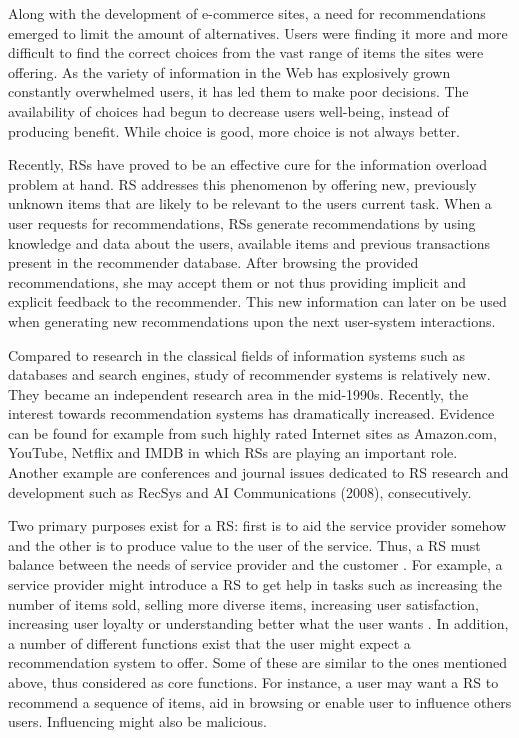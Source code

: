 \documentclass[12pt,a4paper,english
]{tutthesis}
\begin{document}
Along with the development of e-commerce sites, a need for recommendations emerged to limit the amount of alternatives. Users were finding it more and more difficult to find the correct choices from the vast range of items the sites were offering. As the variety of information in the Web has explosively grown constantly overwhelmed users, it has led them to make poor decisions. The availability of choices had begun to decrease users well-being, instead of producing benefit. While choice is good, more choice is not always better. \cite{ricci11}

Recently, RSs have proved to be an effective cure for the information overload problem at hand. RS addresses this phenomenon by offering new, previously unknown items that are likely to be relevant to the users current task. When a user requests for recommendations, RSs generate recommendations by using knowledge and data about the users, available items and previous transactions present in the recommender database. After browsing the provided recommendations, she may accept them or not thus providing implicit and explicit feedback to the recommender. This new information can later on be used when generating new recommendations upon the next user-system interactions. \cite{ricci11}

Compared to research in the classical fields of information systems such as databases and search engines, study of recommender systems is relatively new. They became an independent research area in the mid-1990s. Recently, the interest towards recommendation systems has dramatically increased. Evidence can be found for example from such highly rated Internet sites as Amazon.com, YouTube, Netflix and IMDB in which RSs are playing an important role. Another example are conferences and journal issues dedicated to RS research and development such as RecSys and AI Communications (2008), consecutively. \cite{ricci11}

Two primary purposes exist for a RS: first is to aid the service provider somehow and the other is to produce value to the user of the service. Thus, a RS must balance between the needs of service provider and the customer \cite{ricci11}. For example, a service provider might introduce a RS to get help in tasks such as increasing the number of items sold, selling more diverse items, increasing user satisfaction, increasing user loyalty or understanding better what the user wants \cite{ricci11}. In addition, a number of different functions exist that the user might expect a recommendation system to offer. Some of these are similar to the ones mentioned above, thus considered as core functions. For instance, a user may want a RS to recommend a sequence of items, aid in browsing or enable user to influence others users. Influencing might also be malicious. \cite{ricci11}
\end{document}

